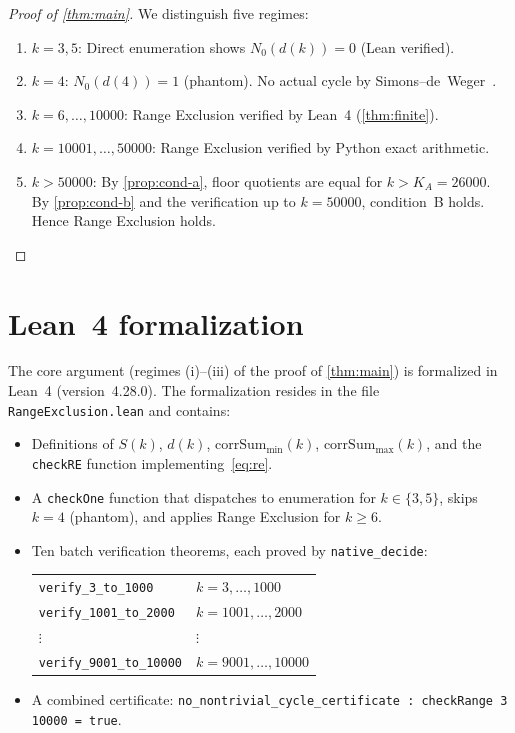 \documentclass[11pt, a4paper]{amsart}
\theoremstyle{plain}
\theoremstyle{definition}
\theoremstyle{remark}
\newcommand{\corrSum}{\mathrm{corrSum}}
\begin{document}
\begin{proof}[Proof of \cref{thm:main}]
  We distinguish five regimes:
  \begin{enumerate}[label=\textbf{(\roman*)}]
    \item $k = 3, 5$: Direct enumeration shows $N_0(d(k)) = 0$
          (Lean verified).
    \item $k = 4$: $N_0(d(4)) = 1$ (phantom). No actual cycle
          by Simons--de~Weger~\cite{SimonsDeWeger2005}.
    \item $k = 6, \ldots, 10000$: Range Exclusion verified by
          Lean~4 (\cref{thm:finite}).
    \item $k = 10001, \ldots, 50000$: Range Exclusion verified
          by Python exact arithmetic.
    \item $k > 50000$: By \cref{prop:cond-a}, floor quotients
          are equal for $k > K_A = 26000$. By \cref{prop:cond-b}
          and the verification up to $k = 50000$, condition~B
          holds. Hence Range Exclusion holds. \qedhere
  \end{enumerate}
\end{proof}

\section{Lean~4 formalization}\label{sec:lean}

The core argument (regimes (i)--(iii) of the proof of
\cref{thm:main}) is formalized in Lean~4 (version~4.28.0).
The formalization resides in the file
\texttt{RangeExclusion.lean} and contains:

\begin{itemize}
  \item Definitions of $S(k)$, $d(k)$, $\corrSum_{\min}(k)$,
    $\corrSum_{\max}(k)$, and the \texttt{checkRE} function
    implementing~\eqref{eq:re}.
  \item A \texttt{checkOne} function that dispatches to
    enumeration for $k \in \{3, 5\}$, skips $k = 4$ (phantom),
    and applies Range Exclusion for $k \geq 6$.
  \item Ten batch verification theorems, each proved by
    \texttt{native\_decide}:
    \begin{center}
    \begin{tabular}{ll}
      \texttt{verify\_3\_to\_1000} & $k = 3, \ldots, 1000$ \\
      \texttt{verify\_1001\_to\_2000} & $k = 1001, \ldots, 2000$ \\
      $\vdots$ & $\vdots$ \\
      \texttt{verify\_9001\_to\_10000} & $k = 9001, \ldots, 10000$ \\
    \end{tabular}
    \end{center}
  \item A combined certificate:
    \texttt{no\_nontrivial\_cycle\_certificate :
    checkRange 3 10000 = true}.
\end{itemize}
\end{document}
